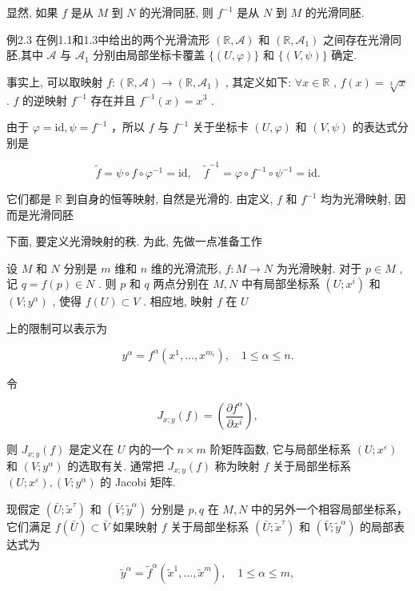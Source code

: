 显然, 如果  $f$  是从  $M$  到  $N$  的光滑同胚, 则  $f^{-1}$  是从  $N$  到  $M$  的光滑同胚.

例2.3 在例1.1和1.3中给出的两个光滑流形  $(\mathbb{R},\mathcal{A})$  和  $(\mathbb{R},\mathcal{A}_1)$  之间存在光滑同胚,其中  $\mathcal{A}$  与  $\mathcal{A}_1$  分别由局部坐标卡覆盖  $\{(U,\varphi)\}$  和  $\{(V,\psi)\}$  确定.

事实上, 可以取映射  $f: (\mathbb{R}, \mathcal{A}) \to (\mathbb{R}, \mathcal{A}_1)$ , 其定义如下:  $\forall x \in \mathbb{R}$ ,  $f(x) = \sqrt[3]{x}$ .  $f$  的逆映射  $f^{-1}$  存在并且  $f^{-1}(x) = x^3$ .

由于  $\varphi = \mathrm{id},\psi = f^{-1}$  ，所以  $f$  与  $f^{-1}$  关于坐标卡  $(U,\varphi)$  和  $(V,\psi)$  的表达式分别是

$$
\tilde {f} = \psi \circ f \circ \varphi^ {- 1} = \mathrm {i d}, \quad \tilde {f} ^ {- 1} = \varphi \circ f ^ {- 1} \circ \psi^ {- 1} = \mathrm {i d}.
$$

它们都是  $\mathbb{R}$  到自身的恒等映射, 自然是光滑的. 由定义,  $f$  和  $f^{-1}$  均为光滑映射, 因而是光滑同胚

下面, 要定义光滑映射的秩. 为此, 先做一点准备工作

设  $M$  和  $N$  分别是  $m$  维和  $n$  维的光滑流形,  $f: M \to N$  为光滑映射. 对于  $p \in M$ , 记  $q = f(p) \in N$ . 则  $p$  和  $q$  两点分别在  $M, N$  中有局部坐标系  $(U; x^i)$  和  $(V; y^\alpha)$ , 使得  $f(U) \subset V$ . 相应地, 映射  $f$  在  $U$

上的限制可以表示为

$$
y ^ {\alpha} = f ^ {\alpha} \left(x ^ {1}, \dots , x ^ {m _ {i}}\right), \quad 1 \leqslant \alpha \leqslant n.
$$

令

$$
J _ {x; y} (f) = \left(\frac {\partial f ^ {\alpha}}{\partial x ^ {i}}\right),
$$

则  $J_{x;y}(f)$  是定义在  $U$  内的一个  $n \times m$  阶矩阵函数, 它与局部坐标系  $(U; x^{\varepsilon})$  和  $(V; y^{\alpha})$  的选取有关. 通常把  $J_{x;y}(f)$  称为映射  $f$  关于局部坐标系  $(U; x^{\varepsilon}), (V; y^{\alpha})$  的 Jacobi 矩阵.

现假定  $(\bar{U};\tilde{x}^{\tau})$  和  $(\bar{V};\tilde{y}^{\alpha})$  分别是  $p,q$  在  $M,N$  中的另外一个相容局部坐标系，它们满足  $f(\bar{U})\subset \bar{V}$  如果映射  $f$  关于局部坐标系  $(\bar{U};\tilde{x}^{\tau})$  和  $(\bar{V};\tilde{y}^{\alpha})$  的局部表达式为

$$
\tilde {y} ^ {\alpha} = \tilde {f} ^ {\alpha} (\tilde {x} ^ {1}, \dots , \tilde {x} ^ {m}), \quad 1 \leqslant \alpha \leqslant m,
$$

